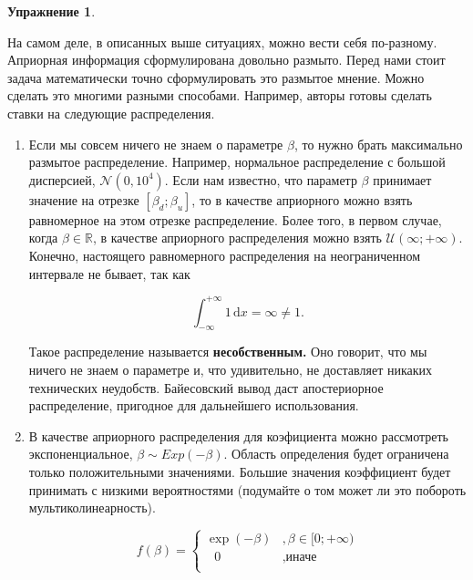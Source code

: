 \documentclass[12pt, a4paper, oneside]{extreport}
\def \b{\beta}
\def \mN{\mathcal{N}}
\def \mU{\mathcal{U}}
\def \mbb{\mathbb}
\def \RR{\mbb R}
\newcommand{\dx}[1]{\,\mathrm{d}#1} %
\newcommand{\indef}[1]{\textbf{#1}}     %
\theoremstyle{plain}              %
\theoremstyle{definition}         %
\newtheorem{problem}{\color{myblue} Упражнение}
\begin{document}
\begin{problem}
\begin{sol}	
На самом деле, в описанных выше ситуациях, можно вести себя по-разному. Априорная информация сформулирована довольно размыто. Перед нами стоит задача математически точно сформулировать это размытое мнение. Можно сделать это многими разными способами. Например, авторы готовы сделать ставки на следующие распределения.

\begin{enumerate}

\item Если мы совсем ничего не знаем о параметре $\b$, то нужно брать максимально размытое распределение. Например, нормальное распределение с большой дисперсией, $\mN(0, 10^4)$. Если нам известно, что параметр $\b$ принимает значение на отрезке $[\b_d; \b_u]$, то в качестве априорного можно взять равномерное на этом отрезке распределение. Более того, в первом случае, когда $\b \in \RR$, в качестве априорного распределения можно взять $\mU(\infty; +\infty)$. Конечно, настоящего равномерного распределения на неограниченном интервале не бывает, так как 

\[ \int_{-\infty}^{+\infty} 1 \dx{x} = \infty \neq 1.\]

Такое распределение называется \indef{несобственным.} Оно говорит, что мы ничего не знаем о параметре и, что удивительно, не доставляет никаких технических неудобств. Байесовский вывод даст апостериорное распределение, пригодное для дальнейшего использования.

\item В качестве априорного распределения для коэфициента можно рассмотреть экспоненциальное, $\beta \sim Exp(-\beta)$. Область определения будет ограничена только положительными значениями. Большие значения коэффициент будет принимать с низкими вероятностями (подумайте о том может ли это побороть мультиколинеарность).

\begin{figure}[H]
\begin{minipage}[H]{0.49\linewidth}
\begin{center}
\[ f(\beta) = \begin{cases}
\exp(-\beta)&, \beta \in [0;+\infty) \\
\mbox{ } 0&, \text{иначе}\\
\end{cases} \]
\end{center}
\end{minipage}
\hfill
\begin{minipage}[H]{0.49\linewidth}
\begin{center}
\end{center}
\end{minipage}
\end{figure}


\end{enumerate}
\end{sol}
\end{problem}
\end{document}
